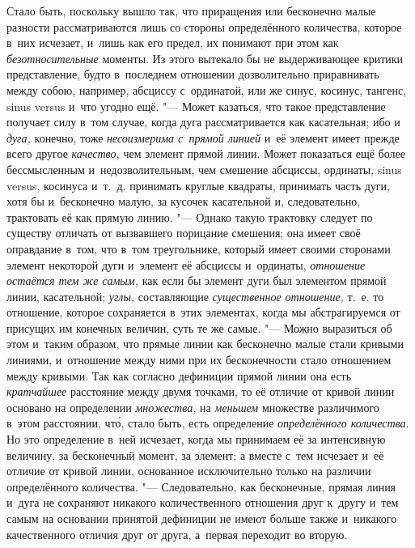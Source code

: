Стало быть, поскольку вышло так, что приращения или бесконечно малые разности
рассматриваются лишь со стороны определённого количества, которое в~них
исчезает, и~лишь как его предел, их понимают при этом как
{\em безотносительные} моменты. Из этого вытекало бы не выдерживающее критики
представление, будто в~последнем отношении дозволительно приравнивать между
собою, например, абсциссу с~ординатой, или же синус, косинус, тангенс, sinus
versus и~что угодно ещё. "--- Может казаться, что такое представление получает
силу в~том случае, когда дуга рассматривается как касательная; ибо и {\em дуга,}
конечно, тоже {\em несоизмерима с~прямой линией} и~её элемент имеет прежде
всего другое {\em качество,} чем элемент прямой линии. Может показаться ещё
более бессмысленным и~недозволительным, чем смешение абсциссы, ординаты, sinus
versus, косинуса и~т.~д. принимать круглые квадраты, принимать часть дуги, хотя
бы и~бесконечно малую, за кусочек касательной и, следовательно, трактовать её
как прямую линию. "--- Однако такую трактовку следует по существу отличать от
вызвавшего порицание смешения; она имеет своё оправдание в~том, что в~том
треугольнике, который имеет своими сторонами элемент некоторой дуги и~элемент
её абсциссы и~ординаты, {\em отношение остаётся тем же самым,} как если бы
элемент дуги был элементом прямой линии, касательной; {\em углы,} составляющие
{\em существенное отношение,} т.~е. то отношение, которое сохраняется в~этих
элементах, когда мы абстрагируемся от присущих им конечных величин, суть те же
самые. "--- Можно выразиться об этом и~таким образом, что прямые линии как
бесконечно малые стали кривыми линиями, и~отношение между ними при их
бесконечности стало отношением между кривыми. Так как согласно дефиниции прямой
линии она есть {\em кратчайшее} расстояние между двумя точками, то её отличие
от кривой линии основано на определении {\em множества,} на {\em меньшем}
множестве различимого в~этом расстоянии, чт\'{о}, стало быть, есть
определение {\em определённого количества}. Но это определение в~ней исчезает, когда мы
принимаем её за интенсивную величину, за бесконечный момент, за элемент; а
вместе с~тем исчезает и~её отличие от кривой линии, основанное исключительно
только на различии определённого количества. "--- Следовательно, как
бесконечные, прямая линия и~дуга не сохраняют никакого количественного
отношения друг к~другу и~тем самым на основании принятой дефиниции не имеют
больше также и~никакого качественного отличия друг от друга, а~первая переходит
во вторую.

